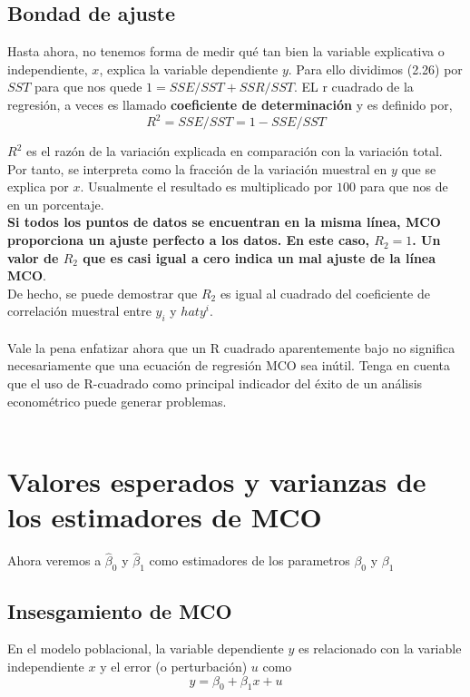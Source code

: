 \subsection{Bondad de ajuste}
Hasta ahora, no tenemos forma de medir qué tan bien la variable explicativa o independiente, $x$, explica la variable dependiente $y$. Para ello dividimos (2.26) por $SST$ para que nos quede $1=SSE/SST + SSR/SST$. EL r cuadrado de la regresión, a veces es llamado \textbf{coeficiente de determinación} y es definido por,
\begin{equation}
	R^2 = SSE/SST = 1 - SSE/SST
\end{equation}

$R^2$ es el razón de la variación explicada en comparación con la variación total. Por tanto, se interpreta como la fracción de la variación muestral en $y$ que se explica por $x$. Usualmente el resultado es multiplicado por $100$ para que nos de en un porcentaje.\\
\textbf{Si todos los puntos de datos se encuentran en la misma línea, MCO proporciona un ajuste perfecto a los datos. En este caso, $R_2 = 1$. Un valor de $R_2$ que es casi igual a cero indica un mal ajuste de la línea MCO}.\\
De hecho, se puede demostrar que $R_2$ es igual al cuadrado del coeficiente de correlación muestral entre $y_i$ y $hat{y}^i$.\\\\
Vale la pena enfatizar ahora que un R cuadrado aparentemente bajo no significa necesariamente que una ecuación de regresión MCO sea inútil. Tenga en cuenta que el uso de R-cuadrado como principal indicador del éxito de un análisis econométrico puede generar problemas.\\\\

\setcounter{section}{4}
\section{Valores esperados y varianzas de los estimadores de MCO}
Ahora veremos a $\hat{\beta}_0$ y $\hat{\beta}_1$ como estimadores de los parametros $\beta_0$ y $\beta_1$

\subsection{Insesgamiento de MCO}

\begin{tcolorbox}[title={Supuesto 1 SLR.1. Liniealidad en los parametros},colback = white]
    En el modelo poblacional, la variable dependiente $y$ es relacionado con la variable independiente $x$ y el error (o perturbación) $u$ como 
    \begin{equation}
	y = \beta_0 + \beta_1 x + u
    \end{equation}
\end{tcolorbox}

